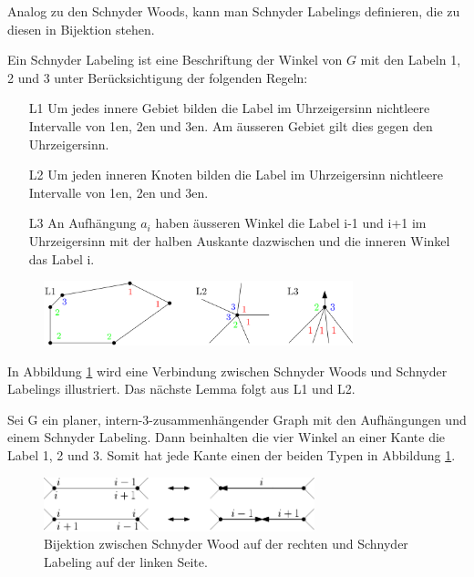 Analog zu den Schnyder Woods, kann man Schnyder Labelings definieren, die zu diesen in Bijektion stehen.

\begin{definition}\label{def_sl}
Ein Schnyder Labeling ist eine Beschriftung der Winkel von $G$ mit den Labeln 1, 2 und 3 unter Berücksichtigung der folgenden Regeln:
\begin{itemize}
\item[L1] Um jedes innere Gebiet bilden die Label im Uhrzeigersinn nichtleere Intervalle von 1en, 2en und 3en. Am äusseren Gebiet gilt dies gegen den Uhrzeigersinn.
\item[L2] Um jeden inneren Knoten bilden die Label im Uhrzeigersinn nichtleere Intervalle von 1en, 2en und 3en.
\item[L3] An Aufhängung $a_i$ haben äusseren Winkel die Label i-1 und i+1 im Uhrzeigersinn mit der halben Auskante dazwischen und die inneren Winkel das Label i.
\end{itemize} 
\begin{figure}[h]
	\centering
  \includegraphics[width=0.8\textwidth]{schnyder_label_def.png}
\end{figure}
\end{definition}

In Abbildung \ref{schnyder_bij} wird eine Verbindung zwischen Schnyder Woods und Schnyder Labelings illustriert. Das nächste Lemma folgt aus L1 und L2.

\begin{lemma}\label{lem_sl}
Sei G ein planer, intern-3-zusammenhängender Graph mit den Aufhängungen und einem Schnyder Labeling. Dann beinhalten die vier Winkel an einer Kante die Label 1, 2 und 3. Somit hat jede Kante einen der beiden Typen in Abbildung \ref{schnyder_bij}.
\end{lemma}

\begin{figure}[h]
	\centering
  \includegraphics[width=0.7\textwidth]{schnyder_bij.png}
	\caption{Bijektion zwischen Schnyder Wood auf der rechten und Schnyder Labeling auf der linken Seite.}
	\label{schnyder_bij}
\end{figure}


